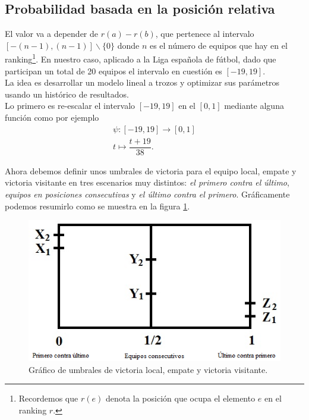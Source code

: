 \subsection{Probabilidad basada en la posición relativa}
El valor va a depender de $r(a)-r(b)$, que pertenece al intervalo $[-(n-1),(n-1)] \backslash \{0\}$ donde $n$ es el número de equipos que hay en el ranking\footnote{Recordemos que $r(e)$ denota la posición que ocupa el elemento $e$ en el ranking $r$.}. En nuestro caso, aplicado a la Liga española de fútbol, dado que participan un total de 20 equipos el intervalo en cuestión es $[-19,19]$.\\

La idea es desarrollar un modelo lineal a trozos y optimizar sus parámetros usando un histórico de resultados.\\

Lo primero es re-escalar el intervalo $[-19,19]$ en el $[0,1]$ mediante alguna función como por ejemplo
\begin{eqnarray*}
	\psi: [-19,19] \longrightarrow [0,1] \\
	t \longmapsto \dfrac{t+19}{38}.
\end{eqnarray*}

Ahora debemos definir unos umbrales de victoria para el equipo local, empate y victoria visitante en tres escenarios muy distintos: \textit{el primero contra el último}, \textit{equipos en posiciones consecutivas} y \textit{el último contra el primero}. Gráficamente podemos resumirlo como se muestra en la figura \ref{fig:umbrales}.

\begin{figure}[htb]
		\centering
		\includegraphics[scale=0.7]{images/umbrales.png}
		\caption{Gráfico de umbrales de victoria local, empate y victoria visitante.} \label{fig:umbrales}
\end{figure}

